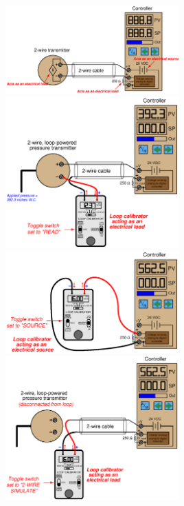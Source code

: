 \includegraphics[width=0.5\textwidth]{current13.eps}
\includegraphics[width=0.5\textwidth]{current29.eps}
\includegraphics[width=0.5\textwidth]{current30.eps}
\includegraphics[width=0.5\textwidth]{current31.eps}
